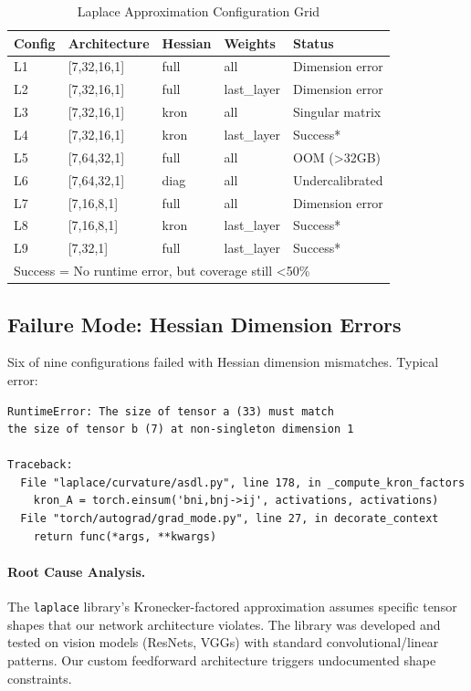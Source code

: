 \begin{table}[!ht]
\centering
\caption{Laplace Approximation Configuration Grid}
\label{tab:laplace-configs}
\begin{tabular}{@{} l l l l l @{}}
\toprule
\textbf{Config}  & \textbf{Architecture}  & \textbf{Hessian}  & \textbf{Weights}  & \textbf{Status} \\
\midrule
L1 & [7,32,16,1] & full & all & Dimension error \\
L2 & [7,32,16,1] & full & last\_layer & Dimension error \\
L3 & [7,32,16,1] & kron & all & Singular matrix \\
L4 & [7,32,16,1] & kron & last\_layer & Success* \\
L5 & [7,64,32,1] & full & all & OOM (>32GB) \\
L6 & [7,64,32,1] & diag & all & Undercalibrated \\
L7 & [7,16,8,1] & full & all & Dimension error \\
L8 & [7,16,8,1] & kron & last\_layer & Success* \\
L9 & [7,32,1] & full & last\_layer & Success* \\
\bottomrule
\multicolumn{5}{l}{\footnotesize *Success = No runtime error, but coverage still <50\%}
\end{tabular}
\end{table}

\subsection{Failure Mode: Hessian Dimension Errors}

Six of nine configurations failed with Hessian dimension mismatches. Typical error:

\begin{lstlisting}
RuntimeError: The size of tensor a (33) must match
the size of tensor b (7) at non-singleton dimension 1

Traceback:
  File "laplace/curvature/asdl.py", line 178, in _compute_kron_factors
    kron_A = torch.einsum('bni,bnj->ij', activations, activations)
  File "torch/autograd/grad_mode.py", line 27, in decorate_context
    return func(*args, **kwargs)
\end{lstlisting}

\paragraph{Root Cause Analysis.}
The \texttt{laplace} library's Kronecker-factored approximation assumes specific tensor shapes that our network architecture violates. The library was developed and tested on vision models (ResNets, VGGs) with standard convolutional/linear patterns. Our custom feedforward architecture triggers undocumented shape constraints.

